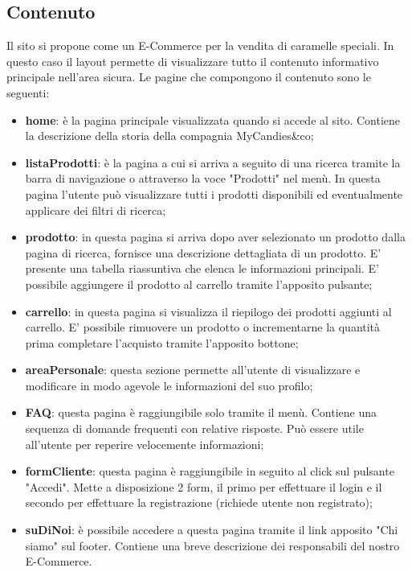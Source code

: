 \subsection{Contenuto}
Il sito si propone come un E-Commerce per la vendita di caramelle speciali. In questo caso il layout permette di visualizzare tutto il contenuto informativo principale nell'area sicura.
Le pagine che compongono il contenuto sono le seguenti:
\begin{itemize}
    \item \textbf{home}: è la pagina principale visualizzata quando si accede al sito. Contiene la descrizione della storia della compagnia MyCandies\&co;
    \item \textbf{listaProdotti}: è la pagina a cui si arriva a seguito di una ricerca tramite la barra di navigazione o attraverso la voce "Prodotti" nel menù. In questa pagina l'utente può visualizzare tutti i prodotti disponibili ed eventualmente applicare dei filtri di ricerca;
    \item \textbf{prodotto}: in questa pagina si arriva dopo aver selezionato un prodotto dalla pagina di ricerca, fornisce una descrizione dettagliata di un prodotto. E' presente una tabella riassuntiva che elenca le informazioni principali. E' possibile aggiungere il prodotto al carrello tramite l'apposito pulsante;
    \item \textbf{carrello}: in questa pagina si visualizza il riepilogo dei prodotti aggiunti al carrello. E' possibile rimuovere un prodotto o incrementarne la quantità prima completare l'acquisto tramite l'apposito bottone;
    \item \textbf{areaPersonale}: questa sezione permette all'utente di visualizzare e modificare in modo agevole le informazioni del suo profilo;
    \item \textbf{FAQ}: questa pagina è raggiungibile solo tramite il menù. Contiene una sequenza di domande frequenti con relative risposte. Può essere utile all'utente per reperire velocemente informazioni;
    \item \textbf{formCliente}: questa pagina è raggiungibile in seguito al click sul pulsante "Accedi". Mette a disposizione 2 form, il primo per effettuare il login e il secondo per effettuare la registrazione (richiede utente non registrato);
    \item \textbf{suDiNoi}: è possibile accedere a questa pagina tramite il link apposito "Chi siamo" sul footer. Contiene una breve descrizione dei responsabili del nostro E-Commerce. 
\end{itemize}
